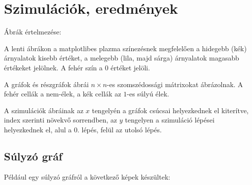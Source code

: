 \chapter{Szimulációk, eredmények}

Ábrák értelmezése:

A lenti ábrákon a matplotlibes plazma színezésnek megfelelően a hidegebb (kék)
árnyalatok kisebb értéket, a melegebb (lila, majd sárga) árnyalatok magasabb
értékeket jelölnek. A fehér szín a 0 értéket jelöli.

A gráfok és részgráfok ábrái $n \times n$-es szomszédossági mátrixokat
ábrázolnak. A fehér cellák a nem-élek, a kék cellák az $1$-es súlyú élek.

A szimulációk ábráinak az $x$ tengelyén a gráfok csúcsai helyezkednek el
kiterítve, index szerinti növekvő sorrendben, az $y$ tengelyen a szimuláció
lépései helyezkednek el, alul a $0.$ lépés, felül az utolsó lépés.

\section{Súlyzó gráf}

Például egy súlyzó gráfról a következő képek készültek:

